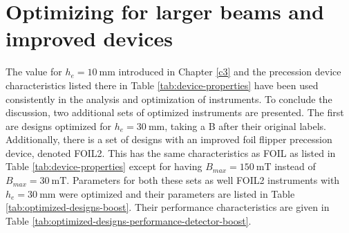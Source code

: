 \section{Optimizing for larger beams and improved devices}
The value for $h_e = \SI{10}{\milli\meter}$ introduced in Chapter \ref{c3} and the precession device characteristics listed there in Table \ref{tab:device-properties} have been used consistently in the analysis and optimization of instruments. To conclude the discussion, two additional sets of optimized instruments are presented. The first are designs optimized for $h_e = \SI{30}{\milli\meter}$, taking a B after their original labels. Additionally, there is a set of designs with an improved foil flipper precession device, denoted FOIL2. This has the same characteristics as FOIL as listed in Table \ref{tab:device-properties} except for having $B_{max} = \SI{150}{\milli\tesla}$ instead of $B_{max} = \SI{30}{\milli\tesla}$. Parameters for both these sets as well FOIL2 instruments with $h_e = \SI{30}{\milli\meter}$ were optimized and their parameters are listed in Table \ref{tab:optimized-designs-boost}. Their performance characteristics are given in Table \ref{tab:optimized-designs-performance-detector-boost}. 
